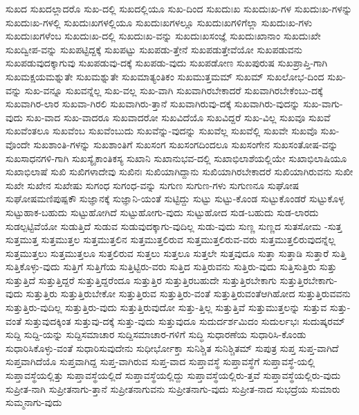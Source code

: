 {ಸುಖದ
ಸುಖದಲ್ಲಾದರೊ
ಸುಖ-ದಲ್ಲಿ
ಸುಖದಲ್ಲಿಯೂ
ಸುಖ-ದಿಂದ
ಸುಖದುಃಖ
ಸುಖದುಃಖ-ಗಳ
ಸುಖದುಃಖ-ಗಳನ್ನು
ಸುಖದುಃಖ-ಗಳಲ್ಲಿ
ಸುಖದುಃಖಗಳಲ್ಲಿಯೂ
ಸುಖದುಃಖಗಳಲ್ಲೂ
ಸುಖದುಃಖಗಳಿಗೆಲ್ಲಾ
ಸುಖದುಃಖ-ಗಳು
ಸುಖದುಃಖಗಳೆಂಬ
ಸುಖದುಃಖ-ದಲ್ಲಿ
ಸುಖದುಃಖ-ವನ್ನು
ಸುಖದುಃಖಸಂಜ್ಞೆ
ಸುಖದುಃಖಾನಾಂ
ಸುಖದುಃಖೇ
ಸುಖದ್ವೀಪ-ವನ್ನು
ಸುಖಪಟ್ಟಿದ್ದಕ್ಕೆ
ಸುಖಪಟ್ಟು
ಸುಖಪಡು-ತ್ತೇನೆ
ಸುಖಪಡುತ್ತೇವೆಯೋ
ಸುಖಪಡುವನು
ಸುಖಪಡುವುದಕ್ಕಾಗುವು
ಸುಖಪಡುವು-ದಕ್ಕೆ
ಸುಖಪಡು-ವುದು
ಸುಖಪಡೋಣ
ಸುಖಪುರುಷ
ಸುಖಪ್ರಾಪ್ತಿ-ಗಾಗಿ
ಸುಖಮಕ್ಷಯಮಶ್ನುತೇ
ಸುಖಮಶ್ನುತೇ
ಸುಖಮಾತ್ಯಂತಿಕಂ
ಸುಖಮುತ್ತಮಮ್
ಸುಖಮ್
ಸುಖಲೋಭ-ದಿಂದ
ಸುಖ-ವನ್ನು
ಸುಖ-ವನ್ನೂ
ಸುಖವನ್ನೆಲ್ಲ
ಸುಖ-ವಲ್ಲ
ಸುಖ-ವಾಗಿ
ಸುಖವಾಗಿರಬೇಕಾದರೆ
ಸುಖವಾಗಿರಬೇಕೆಂಬು-ದಕ್ಕೆ
ಸುಖವಾಗಿರ-ಲಾರ
ಸುಖವಾ-ಗಿರಲಿ
ಸುಖವಾಗಿರು-ತ್ತಾನೆ
ಸುಖವಾಗಿರುವು-ದಕ್ಕೆ
ಸುಖವಾಗಿರು-ವುದನ್ನು
ಸುಖ-ವಾಗು-ವುದು
ಸುಖ-ವಾದ
ಸುಖ-ವಾದರೂ
ಸುಖವಾದರೋ
ಸುಖವಿದೆಯೊ
ಸುಖವಿದ್ದರೆ
ಸುಖ-ವಿಲ್ಲ
ಸುಖವೂ
ಸುಖವೆ
ಸುಖವೆಂತಲೂ
ಸುಖವೆಂಬ
ಸುಖವೆಂಬುದು
ಸುಖವೆನ್ನು-ವುದನ್ನು
ಸುಖವೆಲ್ಲ
ಸುಖವೆಲ್ಲಿ
ಸುಖವೇ
ಸುಖವೊ
ಸುಖ-ವೊಂದೇ
ಸುಖಶಾಂತಿ-ಗಳನ್ನು
ಸುಖಶಾಂತಿಗೆ
ಸುಖಸಂಗ
ಸುಖಸಂಗದಿಂದಲೂ
ಸುಖಸಂಗೇನ
ಸುಖಸಂತೋಷ-ವನ್ನು
ಸುಖಸಾಧನಗಳಿ-ಗಾಗಿ
ಸುಖಸ್ಯೈಕಾಂತಿಕಸ್ಯ
ಸುಖಾನಿ
ಸುಖಾನುಭವ-ದಲ್ಲಿ
ಸುಖಾಭಿಲಾಶೆಯಲ್ಲಿಯೇ
ಸುಖಾಭಿಲಾಷಿಯೂ
ಸುಖಾಭಿಲಾಷೆ
ಸುಖಿ
ಸುಖಿಗಳಾದೇವು
ಸುಖಿನಃ
ಸುಖಿಯಾಗಿದ್ದಾನು
ಸುಖಿಯಾಗಿರಬೇಕಾದರೆ
ಸುಖಿಯಾಗಿರುವನು
ಸುಖೀ
ಸುಖೇ
ಸುಖೇನ
ಸುಖೇಷು
ಸುಗಂಧ
ಸುಗಂಧ-ವನ್ನು
ಸುಗುಣ
ಸುಗುಣ-ಗಳು
ಸುಗುಣನೂ
ಸುಘೋಷ
ಸುಘೋಷಮಣಿಪುಷ್ಪಕೌ
ಸುಜ್ಞಾನಕ್ಕೆ
ಸುಜ್ಞಾನಿ-ಯಂತೆ
ಸುಟ್ಟಿದ್ದು
ಸುಟ್ಟು
ಸುಟ್ಟು-ಕೊಂಡ
ಸುಟ್ಟುಕೊಂಡರೆ
ಸುಟ್ಟುಕೊಳ್ಳ
ಸುಟ್ಟುಹಾಕ-ಬಹುದು
ಸುಟ್ಟುಹೋಗಿದೆ
ಸುಟ್ಟುಹೋಗು-ವುದು
ಸುಟ್ಟುಹೋದ
ಸುಡ-ಬಹುದು
ಸುಡ-ಲಾರದು
ಸುಡಲ್ಪಟ್ಟಿವೆಯೋ
ಸುಡುತ್ತಿದೆ
ಸುಡುವ
ಸುಡುವುದಕ್ಕಾಗು-ವುದಿಲ್ಲ
ಸುಡು-ವುದು
ಸುಣ್ಣ
ಸುಣ್ಣದ
ಸುತಸೋಮ
-ಸುತ್ತ
ಸುತ್ತಮುತ್ತ
ಸುತ್ತಮುತ್ತಲ
ಸುತ್ತಮುತ್ತಲಿನ
ಸುತ್ತಮುತ್ತಲಿರುವ
ಸುತ್ತಮುತ್ತಲಿರುವ-ವರು
ಸುತ್ತಮುತ್ತಲಿರುವುದನ್ನೆಲ್ಲ
ಸುತ್ತಮುತ್ತಲು
ಸುತ್ತಮುತ್ತಲೂ
ಸುತ್ತಲಿರುವ
ಸುತ್ತಲು
ಸುತ್ತಲೂ
ಸುತ್ತಲೇ
ಸುತ್ತವುದೂ
ಸುತ್ತಾ
ಸುತ್ತಾಡಿ
ಸುತ್ತಾರೆ
ಸುತ್ತಿ
ಸುತ್ತಿಕೊಳ್ಳು-ವುದು
ಸುತ್ತಿಗೆ
ಸುತ್ತಿಗೆಯ
ಸುತ್ತಿಟ್ಟಿರು-ವರು
ಸುತ್ತಿದ
ಸುತ್ತಿರುವನು
ಸುತ್ತಿರು-ವುದು
ಸುತ್ತಿಸುತ್ತಿರು
ಸುತ್ತು
ಸುತ್ತುತ್ತಿದೆ
ಸುತ್ತುತ್ತಿದ್ದರೆ
ಸುತ್ತುತ್ತಿದ್ದರೆಂದೂ
ಸುತ್ತುತ್ತಿರ
ಸುತ್ತುತ್ತಿರಬಹುದೇ
ಸುತ್ತುತ್ತಿರಬೇಕಾಗು
ಸುತ್ತುತ್ತಿರಬೇಕಾಗು-ವುದು
ಸುತ್ತುತ್ತಿರು
ಸುತ್ತುತ್ತಿರುಬೇಕೋ
ಸುತ್ತುತ್ತಿರುವ
ಸುತ್ತುತ್ತಿರು-ವಂತೆ
ಸುತ್ತುತ್ತಿರುವಂತೆಆಗಿಹೋದ
ಸುತ್ತುತ್ತಿರುವವನು
ಸುತ್ತುತ್ತಿರು-ವುದಿಲ್ಲ
ಸುತ್ತುತ್ತಿರು-ವುದು
ಸುತ್ತುತ್ತಿರುವುದೋ
ಸುತ್ತು-ತ್ತಿಲ್ಲ
ಸುತ್ತುತ್ತಿವೆ
ಸುತ್ತುಮುತ್ತಲನ್ನು
ಸುತ್ತುವ
ಸುತ್ತು-ವಂತೆ
ಸುತ್ತುವುದಕ್ಕಿಂತ
ಸುತ್ತುವು-ದಕ್ಕೆ
ಸುತ್ತು-ವುದು
ಸುತ್ತುವುದೂ
ಸುದುರ್ದರ್ಶಮಿದಂ
ಸುದುರ್ಲಭಃ
ಸುದುಷ್ಕರಮ್
ಸುದ್ದಿ
ಸುದ್ದಿ-ಯನ್ನು
ಸುದ್ದಿಸಮಾಚಾರ
ಸುದ್ದಿಸಮಾಚಾರ-ಗಳಿಗೆ
ಸುದ್ಧಿ
ಸುಧಾರಣೆಯ
ಸುಧಾರಿಸಿ-ಕೊಂಡು
ಸುಧಾರಿಸಿಕೊಳ್ಳು-ವಂತೆ
ಸುಧಾರಿಸುವುದೇನು
ಸುಧೀರ್ಭೋಕ್ತಾ
ಸುನಿಶ್ಚಿತ
ಸುನಿಶ್ಚಿತಮ್
ಸುಪುತ್ರ
ಸುಪ್ತ
ಸುಪ್ತ-ವಾಗಿದೆ
ಸುಪ್ತವಾಗಿದೆಯೊ
ಸುಪ್ತವಾಗಿದ್ದ
ಸುಪ್ತ-ವಾಗಿರುವ
ಸುಪ್ತ-ವಾದ
ಸುಪ್ತಾವಸ್ಥೆ
ಸುಪ್ತಾವಸ್ಥೆಗೆ
ಸುಪ್ತಾವಸ್ಥೆ-ಯಲ್ಲಿ
ಸುಪ್ತಾವಸ್ಥೆಯಲ್ಲಿತ್ತು
ಸುಪ್ತಾವಸ್ಥೆಯಲ್ಲಿದೆ
ಸುಪ್ತಾವಸ್ಥೆಯಲ್ಲಿದ್ದು
ಸುಪ್ತಾವಸ್ಥೆಯಲ್ಲಿರು-ತ್ತವೆ
ಸುಪ್ತಾವಸ್ಥೆಯಲ್ಲಿರು-ವುದು
ಸುಪ್ರೀತ-ನಾಗಿ
ಸುಪ್ರೀತನಾಗು-ತ್ತಾನೆ
ಸುಪ್ರೀತನಾಗುವನು
ಸುಪ್ರೀತನಾಗು-ವುದು
ಸುಪ್ರೀತ-ನಾದ
ಸುಭದ್ರೆಯ
ಸುಮಾರು
ಸುಮ್ಮನಾಗು-ವುದು
}
